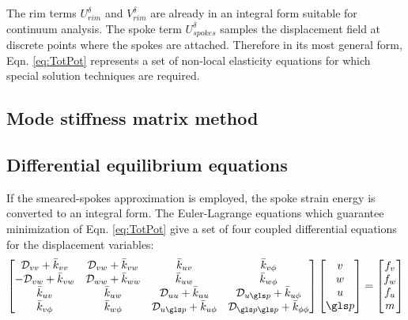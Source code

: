 \documentclass[\rootdir/thesis.tex]{subfiles}
\begin{document}
The rim terms $U_{rim}^{\delta}$ and $V_{rim}^{\delta}$ are already in an integral form suitable for continuum analysis. The spoke term $U_{spokes}^{\delta}$ samples the displacement field at discrete points where the spokes are attached. Therefore in its most general form, Eqn. \eqref{eq:TotPot} represents a set of non-local elasticity equations for which special solution techniques are required.

\subsection{Mode stiffness matrix method}
\label{sec:ModeMatrix}


\subsection{Differential equilibrium equations}

If the smeared-spokes approximation is employed, the spoke strain energy is converted to an integral form. The Euler-Lagrange equations which guarantee minimization of Eqn. \eqref{eq:TotPot} give a set of four coupled differential equations for the displacement variables:
\begin{equation}
\label{eq:EulerLagrange}
\begin{bmatrix}
 \D_{vv} + \kvv & \D_{vw} + \kvw & \kuv              & \kvp\\
-\D_{vw} + \kvw & \D_{ww} + \kww & \kuw              & \kwp\\
\kuv            & \kuw           & \D_{uu} + \kuu    & \D_{u\p} + \kup\\
\kvp            & \kwp           & \D_{u\p} + \kup & \D_{\p\p} + \kpp
\end{bmatrix}
\begin{bmatrix}
v\\w\\u\\\p
\end{bmatrix}=
\begin{bmatrix}
f_v\\f_w\\f_u\\m
\end{bmatrix}
\end{equation}
\end{document}
